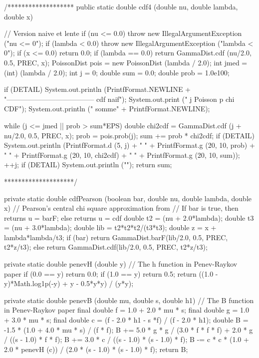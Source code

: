 \begin{code}
\begin{hide}
/*******************
   public static double cdf4 (double nu, double lambda, double x)
   {
      // Version naive et lente
      if (nu <= 0.0)
         throw new IllegalArgumentException ("nu <= 0");
      if (lambda < 0.0)
         throw new IllegalArgumentException ("lambda < 0");
      if (x <= 0.0)
         return 0.0;
      if (lambda == 0.0)
         return GammaDist.cdf (nu/2.0, 0.5, PREC, x);
      PoissonDist pois = new PoissonDist (lambda / 2.0);
      int jmed = (int) (lambda / 2.0);
      int j = 0;
      double sum = 0.0;
      double prob = 1.0e100;

      if (DETAIL) {
         System.out.println (PrintfFormat.NEWLINE +
             "-------------------------------------- cdf naif");
         System.out.print ("   j             Poisson p               chi CDF");
         System.out.println ("            somme" + PrintfFormat.NEWLINE);
      }

      while (j <= jmed || prob > sum*EPS)
      {
         double chi2cdf = GammaDist.cdf (j + nu/2.0, 0.5, PREC, x);
         prob = pois.prob(j);
         sum += prob * chi2cdf;
         if (DETAIL)
            System.out.println (PrintfFormat.d (5, j) + "   " +
                                PrintfFormat.g (20, 10, prob) + "   " +
                                PrintfFormat.g (20, 10, chi2cdf) + "   " +
                                PrintfFormat.g (20, 10, sum));
         ++j;
      }
      if (DETAIL)
         System.out.println ("");
      return sum;
   }
********************/

   private static double cdfPearson (boolean bar, double nu, double lambda,
                                     double x) {
      // Pearson's central chi square approximation from \cite{tPEA59a}
      // If bar is true, then returns u = barF; else returns u = cdf
      double t2 = (nu + 2.0*lambda);
      double t3 = (nu + 3.0*lambda);
      double lib = t2*t2*t2/(t3*t3);
      double z = x + lambda*lambda/t3;
      if (bar)
         return GammaDist.barF(lib/2.0, 0.5, PREC, t2*z/t3);
      else
         return GammaDist.cdf(lib/2.0, 0.5, PREC, t2*z/t3);
   }

   private static double penevH (double y) {
      // The h function in Penev-Raykov paper
      if (0.0 == y)
         return 0.0;
      if (1.0 == y)
         return 0.5;
      return ((1.0 - y)*Math.log1p(-y) + y - 0.5*y*y) / (y*y);
   }


   private static double penevB (double mu, double s, double h1) {
      // The B function in Penev-Raykov paper
      final double f = 1.0 + 2.0 * mu * s;
      final double g = 1.0 + 3.0 * mu * s;
      final double c = (f - 2.0 * h1 - s *f) / (f - 2.0 * h1);
      double B = -1.5 * (1.0 + 4.0 * mu * s) / (f * f);
      B += 5.0 * g * g / (3.0 * f * f * f) + 2.0 * g / ((s - 1.0) * f * f);
      B += 3.0 * c / ((s - 1.0) * (s - 1.0) * f);
      B -= c * c * (1.0 + 2.0 * penevH (c)) / (2.0 * (s - 1.0) * (s - 1.0) * f);
      return B;
   }


\end{hide}
\end{code}
